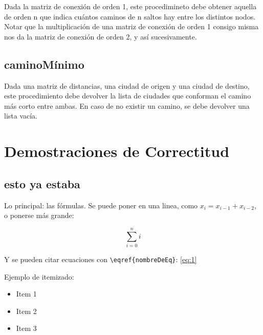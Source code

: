 \documentclass[10pt,a4paper]{article}
\begin{document}
Dada la matriz de conexión de orden 1, este procedimineto debe obtener aquella de orden n que indica cuántos caminos de n saltos hay entre los distintos nodos.
Notar que la multiplicación de una matriz de conexión de orden 1 consigo misma nos da la matriz de conexión de orden 2, y así sucesivamente.


\subsection{caminoMínimo}
Dada una matriz de distancias, una ciudad de origen y una ciudad de destino, este procedimiento debe devolver la lista de ciudades que conforman el camino más corto entre ambas.
En caso de no existir un camino, se debe devolver una lista vacía.


\section{Demostraciones de Correctitud}







\newpage %



\subsection{esto ya estaba}

Lo principal: las fórmulas. Se puede poner en una linea, como $x_i = x_{i-1} + x_{i-2}$, o ponerse más grande:

\begin{equation}
	\sum\limits_{i=0}^{n} i
	\label{eq:1}
\end{equation}

Y se pueden citar ecuaciones con \verb|\eqref{nombreDeEq}|: \eqref{eq:1}

Ejemplo de itemizado:

\begin{itemize}
	\item Item 1
	\item Item 2
	\item Item 3
\end{itemize}
\end{document}

